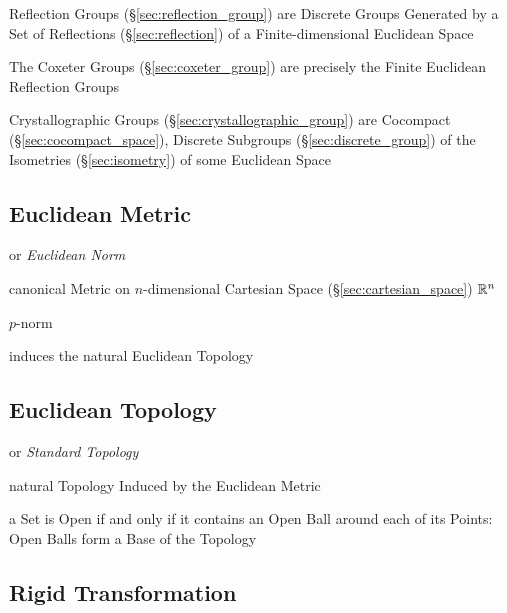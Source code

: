 Reflection Groups (\S\ref{sec:reflection_group}) are Discrete Groups Generated
by a Set of Reflections (\S\ref{sec:reflection}) of a Finite-dimensional
Euclidean Space

The Coxeter Groups (\S\ref{sec:coxeter_group}) are precisely the Finite
Euclidean Reflection Groups

Crystallographic Groups (\S\ref{sec:crystallographic_group}) are Cocompact
(\S\ref{sec:cocompact_space}), Discrete Subgroups (\S\ref{sec:discrete_group})
of the Isometries (\S\ref{sec:isometry}) of some Euclidean Space



\subsection{Euclidean Metric}\label{sec:euclidean_metric}

or \emph{Euclidean Norm}

canonical Metric on $n$-dimensional Cartesian Space
(\S\ref{sec:cartesian_space}) $\mathbb{R}^n$

$p$-norm

induces the natural Euclidean Topology



\subsection{Euclidean Topology}\label{sec:euclidean_topology}

or \emph{Standard Topology}

natural Topology Induced by the Euclidean Metric

a Set is Open if and only if it contains an Open Ball around each of its Points:
Open Balls form a Base of the Topology



\subsection{Rigid Transformation}\label{sec:rigid_transformation}

